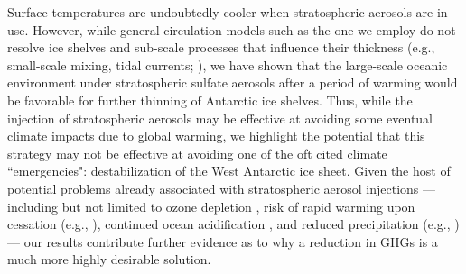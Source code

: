 \documentclass[grl]{AGUTeX}  %
\begin{document}
\begin{article}
Surface temperatures are undoubtedly cooler when stratospheric aerosols are in use. However, while general circulation models such as the one we employ do not resolve ice shelves and sub-scale processes that influence their thickness (e.g., small-scale mixing, tidal currents; \cite{joughin11}), we have shown that the large-scale oceanic environment under stratospheric sulfate aerosols after a period of warming would be favorable for further thinning of Antarctic ice shelves. Thus, while the injection of stratospheric aerosols may be effective at avoiding some eventual climate impacts due to global warming, we highlight the potential that this strategy may not be effective at avoiding one of the oft cited climate ``emergencies": destabilization of the West Antarctic ice sheet. Given the host of potential problems already associated with stratospheric aerosol injections --- including but not limited to ozone depletion \citep{tilmes08,heckendorn09}, risk of rapid warming upon cessation (e.g., \cite{mccusker14}), continued ocean acidification \citep{feely04}, and reduced precipitation (e.g., \cite{bala08}) --- our results contribute further evidence as to why a reduction in GHGs is a much more highly desirable solution. %




%
%
%
%
%
%
%


\end{article}
\end{document}
